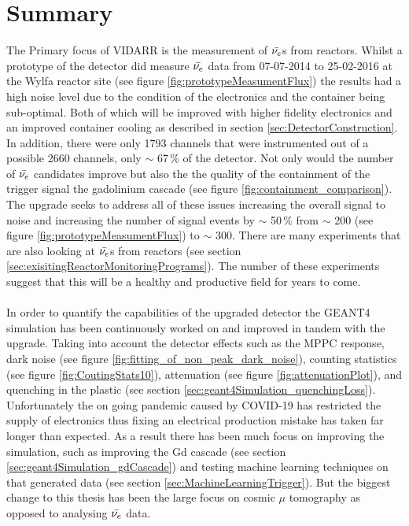 
\chapter{Summary}

\ifpdf
    \graphicspath{{Chapter6/Figs/Raster/}{Chapter6/Figs/PDF/}{Chapter6/Figs/}}
\else
    \graphicspath{{Chapter6/Figs/Vector/}{Chapter6/Figs/}}
\fi

The Primary focus of VIDARR is the measurement of $\Bar{\nu_e}$s from reactors. Whilst a prototype of the detector did measure $\Bar{\nu_e}$ data from 07-07-2014 to 25-02-2016 at the Wylfa reactor site (see figure \ref{fig:prototypeMeasumentFlux}) the results had a high noise level due to the condition of the electronics and the container being sub-optimal. Both of which will be improved with higher fidelity electronics and an improved container cooling as described in section \ref{sec:DetectorConstruction}. In addition, there were only 1793 channels that were instrumented out of a possible 2660 channels, only $\sim$ 67\,\% of the detector. Not only would the number of $\Bar{\nu_e}$ candidates improve but also the the quality of the containment of the trigger signal the gadolinium cascade (see figure \ref{fig:containment_comparison}). The upgrade seeks to address all of these issues increasing the overall signal to noise and increasing the number of signal events by $\sim$ 50\,\% from $\sim$ 200 (see figure \ref{fig:prototypeMeasumentFlux}) to $\sim$ 300. There are many experiments that are also looking at $\Bar{\nu_e}$s from reactors (see section \ref{sec:exisitingReactorMonitoringPrograms}). The number of these experiments suggest that this will be a healthy and productive field for years to come.
\\\\In order to quantify the capabilities of the upgraded detector the GEANT4 simulation has been continuously worked on and improved in tandem with the upgrade. Taking into account the detector effects such as the MPPC response, dark noise (see figure \ref{fig:fitting_of_non_peak_dark_noise}), counting statistics (see figure \ref{fig:CoutingStats10}), attenuation (see figure \ref{fig:attenuationPlot}), and quenching in the plastic (see section \ref{sec:geant4Simulation_quenchingLoss}). Unfortunately the on going pandemic caused by COVID-19 has restricted the supply of electronics thus fixing an electrical production mistake has taken far longer than expected. As a result there has been much focus on improving the simulation, such as improving the Gd cascade (see section \ref{sec:geant4Simulation_gdCascade}) and testing machine learning techniques on that generated data (see section \ref{sec:MachineLearningTrigger}). But the biggest change to this thesis has been the large focus on cosmic $\mu$ tomography as opposed to analysing $\Bar{\nu_e}$ data.
